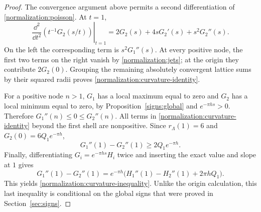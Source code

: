 \begin{proof}
The convergence argument above permits a second differentiation of
\eqref{normalization:poisson}.  At $t=1$,
\[
 \left.\frac{\dd^2}{\dd t^2}\left(t^{-1}G_2(s/t)\right)\right|_{t=1}
 =2G_2(s)+4sG_2'(s)+s^2G_2''(s).
\]
On the left the corresponding term is $s^2G_1''(s)$.  At every positive
node, the first two terms on the right vanish by
\eqref{normalization:jets}; at the origin they contribute $2G_2(0)$.
Grouping the remaining absolutely convergent lattice sums by their squared
radii proves \eqref{normalization:curvature-identity}.

For a positive node $n>1$, $G_1$ has a local maximum equal to zero and
$G_2$ has a local minimum equal to zero, by Proposition~\ref{signs:global}
and $e^{-\pi hs}>0$.
Therefore $G_1''(n)\le0\le G_2''(n)$.  All terms in
\eqref{normalization:curvature-identity} beyond the first shell are
nonpositive.  Since $r_\Lambda(1)=6$ and $G_2(0)=6Q_1e^{-\pi h}$,
\[
 G_1''(1)-G_2''(1)\ge2Q_1e^{-\pi h}.
\]
Finally, differentiating $G_i=e^{-\pi hs}H_i$ twice and inserting the
exact value and slope at $1$ gives
\[
 G_1''(1)-G_2''(1)
 =e^{-\pi h}\bigl(H_1''(1)-H_2''(1)+2\pi hQ_1\bigr).
\]
This yields \eqref{normalization:curvature-inequality}.  Unlike the origin
calculation, this last inequality is conditional on the global signs that
were proved in Section~\ref{sec:signs}.
\end{proof}
